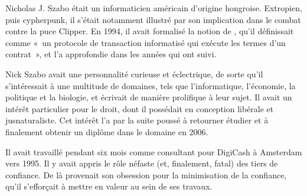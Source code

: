 Nicholas J. Szabo était un informaticien américain d'origine hongroise. Extropien, puis cypherpunk, il s'était notamment illustré par son implication dans le combat contre la puce Clipper. En 1994, il avait formalisé la notion de , qu'il définissait comme «~un protocole de transaction informatisé qui exécute les termes d'un contrat~», et l'a approfondie dans les années qui ont suivi.  %

Nick Szabo avait une personnalité curieuse et éclectrique, de sorte qu'il s'intéressait à une multitude de domaines, tels que l'informatique, l'économie, la politique et la biologie, et écrivait de manière prolifique à leur sujet. Il avait un intérêt particulier pour le droit, dont il possédait en conception libérale et jusnaturaliste. Cet intérêt l'a par la suite poussé à retourner étudier et à finalement obtenir un diplôme dans le domaine en 2006.

Il avait travaillé pendant six mois comme consultant pour DigiCash à Amsterdam vers 1995. Il y avait appris le rôle néfaste (et, finalement, fatal) des tiers de confiance. De là provenait son obsession pour la minimisation de la confiance, qu'il s'efforçait à mettre en valeur au sein de ses travaux.

